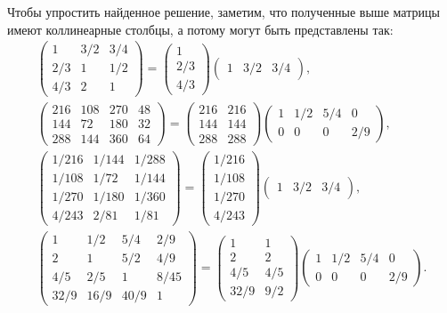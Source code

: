 \documentclass[specialist,
               substylefile = spbu.rtx,
               subf,href,colorlinks=true, 12pt]{disser}
\theoremstyle{definition}
\begin{document}
Чтобы упростить найденное решение, заметим, что полученные выше матрицы имеют коллинеарные столбцы, а потому могут быть представлены так:
\begin{gather*}
\begin{pmatrix}
 1 & 3/2 & 3/4
\\
 2/3 & 1 & 1/2
\\
 4/3 & 2 & 1
\end{pmatrix}
=
\begin{pmatrix}
 1
\\
 2/3
\\
 4/3
\end{pmatrix} 
\begin{pmatrix} 
 1 & 3/2 & 3/4
\end{pmatrix},
\\
\begin{pmatrix}
 216 & 108 & 270 & 48
\\
 144 & 72 & 180 & 32
\\
 288 & 144 & 360 & 64
\end{pmatrix}
=
\begin{pmatrix}
 216 & 216
\\
 144 & 144
\\
 288 & 288
\end{pmatrix}
\begin{pmatrix} 
 1 & 1/2 & 5/4 & 0
\\
 0 & 0 & 0 & 2/9
\end{pmatrix},
\\
\begin{pmatrix}
 1/216 & 1/144 & 1/288
\\
 1/108 & 1/72 & 1/144
\\
 1/270 & 1/180 & 1/360
\\
 4/243 & 2/81 & 1/81
\end{pmatrix}
=
\begin{pmatrix}
 1/216
\\
 1/108
\\
 1/270
\\
 4/243
\end{pmatrix} 
\begin{pmatrix} 
 1 & 3/2 & 3/4
\end{pmatrix},
\\
\begin{pmatrix}
 1 & 1/2 & 5/4 & 2/9
\\
 2 & 1 & 5/2 & 4/9
\\
 4/5 & 2/5 & 1 & 8/45
\\
 32/9 & 16/9 & 40/9 & 1
\end{pmatrix}
=
\begin{pmatrix}
 1 & 1
\\
 2 & 2
\\
 4/5 & 4/5
\\
 32/9 & 9/2
\end{pmatrix}
\begin{pmatrix}
 1 & 1/2 & 5/4 & 0
\\
 0 & 0 & 0 & 2/9
\end{pmatrix}.
\end{gather*}
\end{document}
